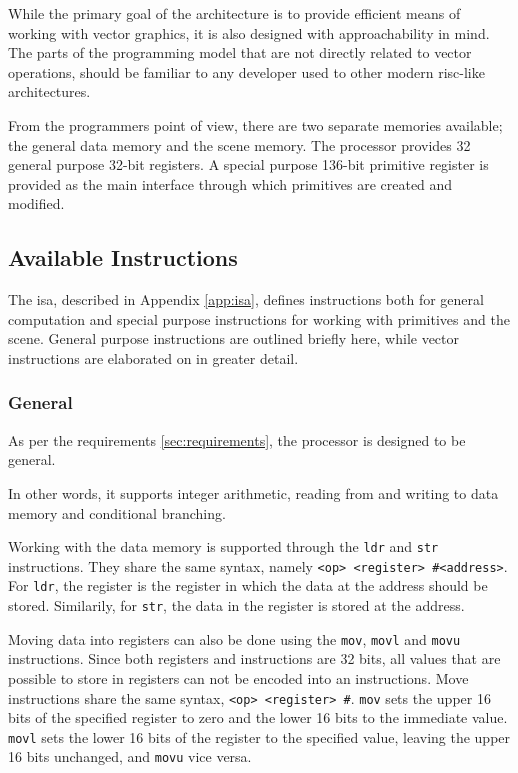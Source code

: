 While the primary goal of the \vthreek architecture is to provide efficient means of working with vector graphics, it is also designed with approachability in mind.
The parts of the programming model that are not directly related to vector operations, should be familiar to any developer used to other modern \gls{risc}-like architectures.

From the programmers point of view, there are two separate memories available; the general data memory and the scene memory.
The processor provides 32 general purpose 32-bit registers.
A special purpose 136-bit primitive register is provided as the main interface through which primitives are created and modified.

\subsection{Available Instructions}

The \vthreek \gls{isa}, described in Appendix \ref{app:isa}, defines instructions both for general computation and special purpose instructions for working with primitives and the scene.
General purpose instructions are outlined briefly here, while vector instructions are elaborated on in greater detail.

\subsubsection{General}

As per the requirements \ref{sec:requirements}, the \vthreek processor is designed to be general.

In other words, it supports integer arithmetic, reading from and writing to data memory and conditional branching.

Working with the data memory is supported through the \texttt{ldr} and \texttt{str} instructions.
They share the same syntax, namely \texttt{<op> <register> \#<address>}.
For \texttt{ldr}, the register is the register in which the data at the address should be stored.
Similarily, for \texttt{str}, the data in the register is stored at the address.

Moving data into registers can also be done using the \texttt{mov}, \texttt{movl} and \texttt{movu} instructions.
Since both registers and instructions are 32 bits, all values that are possible to store in registers can not be encoded into an instructions.
Move instructions share the same syntax, \texttt{<op> <register> \#<16-bit immediate>}.
\texttt{mov} sets the upper 16 bits of the specified register to zero and the lower 16 bits to the immediate value.
\texttt{movl} sets the lower 16 bits of the register to the specified value, leaving the upper 16 bits unchanged, and \texttt{movu} vice versa.

